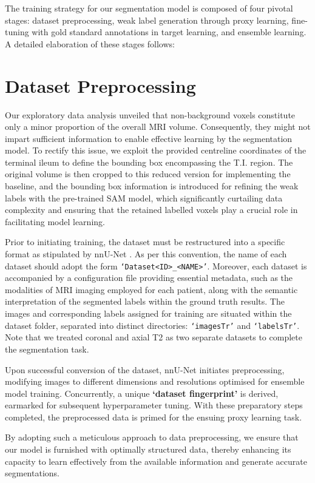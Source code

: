 The training strategy for our segmentation model is composed of four pivotal stages: dataset preprocessing, weak label generation through proxy learning, fine-tuning with gold standard annotations in target learning, and ensemble learning. A detailed elaboration of these stages follows:

\section{Dataset Preprocessing}

Our exploratory data analysis unveiled that non-background voxels constitute only a minor proportion of the overall MRI volume. Consequently, they might not impart sufficient information to enable effective learning by the segmentation model. To rectify this issue, we exploit the provided centreline coordinates of the terminal ileum to define the bounding box encompassing the T.I. region. The original volume is then cropped to this reduced version for implementing the baseline, and the bounding box information is introduced for refining the weak labels with the pre-trained SAM model, which significantly curtailing data complexity and ensuring that the retained labelled voxels play a crucial role in facilitating model learning.

Prior to initiating training, the dataset must be restructured into a specific format as stipulated by nnU-Net \cite{isensee2021nnu}. As per this convention, the name of each dataset should adopt the form \texttt{`Dataset<ID>\_<NAME>'}. Moreover, each dataset is accompanied by a configuration file providing essential metadata, such as the modalities of MRI imaging employed for each patient, along with the semantic interpretation of the segmented labels within the ground truth results. The images and corresponding labels assigned for training are situated within the dataset folder, separated into distinct directories: \texttt{`imagesTr'} and \texttt{`labelsTr'}. Note that we treated coronal and axial T2 as two separate datasets to complete the segmentation task. 

Upon successful conversion of the dataset, nnU-Net initiates preprocessing, modifying images to different dimensions and resolutions optimised for ensemble model training. Concurrently, a unique \textbf{`dataset fingerprint'} is derived, earmarked for subsequent hyperparameter tuning. With these preparatory steps completed, the preprocessed data is primed for the ensuing proxy learning task.

By adopting such a meticulous approach to data preprocessing, we ensure that our model is furnished with optimally structured data, thereby enhancing its capacity to learn effectively from the available information and generate accurate segmentations.

